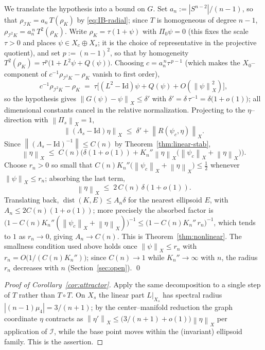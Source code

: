 \documentclass[10pt,a4paper]{amsart}
\newcommand{\IB}{\mathcal{I}}
\newcommand{\norm}[1]{\left\lVert #1 \right\rVert}
\newcommand{\abs}[1]{\left\lvert #1 \right\rvert}
\DeclareMathOperator{\dist}{dist}
\begin{document}
We translate the hypothesis into a bound on $G$. Set
$a_n:=\abs{S^{n-2}}/(n-1)$, so that $\rho_{\IB K}=a_n\,T(\rho_K)$ by
\eqref{eq:IB-radial}; since $T$ is homogeneous of degree $n-1$,
$\rho_{\IB^2K}=a_n^{\,n}\,T^2(\rho_K)$. Write $\rho_K=\tau(1+\psi)$ with
$\Pi_0\psi=0$ (this fixes the scale $\tau>0$ and places
$\psi\in X_c\oplus X_s$; it is the choice of representative in the projective
quotient), and set $p:=(n-1)^2$, so that by homogeneity
$T^2(\rho_K)=\tau^{p}\big(1+L^2\psi+Q(\psi)\big)$. Choosing
$c=a_n^{\,n}\tau^{\,p-1}$ (which makes the $X_0$--component of
$c^{-1}\rho_{\IB^2K}-\rho_K$ vanish to first order),
\[
   c^{-1}\rho_{\IB^2 K}-\rho_K
   \;=\;\tau\Big[(L^2-\mathrm{Id})\psi+Q(\psi)+O(\norm\psi^2_X)\Big],
\]
so the hypothesis gives $\norm{G(\psi)-\psi}_X\le\delta'$ with
$\delta'=\delta\,\tau^{-1}=\delta\big(1+o(1)\big)$; all dimensional constants
cancel in the relative normalization. Projecting to the $\eta$--direction
with $\norm{\Pi_s}_X=1$,
\[
   \norm{(\Lambda_s-\mathrm{Id})\eta}_X
   \;\le\;\delta'+\norm{R(\psi_c,\eta)}_X .
\]
Since $\norm{(\Lambda_s-\mathrm{Id})^{-1}}\le C(n)$ by
Theorem~\ref{thm:linear-stab},
\[
   \norm\eta_X\;\le\;C(n)\Big(\delta(1+o(1))
   +K_n''\norm\eta_X\big(\norm{\psi_c}_X+\norm\eta_X\big)\Big).
\]
Choose $r_n>0$ so small that $C(n)K_n''\big(\norm{\psi_c}_X+\norm\eta_X\big)
\le\tfrac12$ whenever $\norm\psi_X\le r_n$; absorbing the last term,
\[
   \norm\eta_X\;\le\;2\,C(n)\,\delta(1+o(1)).
\]
Translating back, $\dist(K,E)\le A_n\delta$ for the nearest ellipsoid $E$,
with $A_n\le 2C(n)(1+o(1))$; more precisely the absorbed factor is
$\big(1-C(n)K_n''(\norm{\psi_c}_X+\norm\eta_X)\big)^{-1}\le
\big(1-C(n)K_n''\,r_n\big)^{-1}$, which tends to $1$ as $r_n\to0$, giving
$A_n\to C(n)$. This is Theorem~\ref{thm:nonlinear}. The smallness
condition used above holds once $\norm\psi_X\le r_n$ with
$r_n=O\big(1/(C(n)K_n'')\big)$; since $C(n)\to1$ while
$K_n''\to\infty$ with $n$, the radius $r_n$ decreases with $n$
(Section~\ref{sec:open}).
\qed

\begin{proof}[Proof of Corollary~\ref{cor:attractor}]
Apply the same decomposition to a single step of $T$ rather than $T\circ T$.
On $X_s$ the linear part $L|_{X_s}$ has spectral radius $\abs{(n-1)\mu_4}
=3/(n+1)$; by the center--manifold reduction the graph coordinate $\eta$
contracts as $\norm{\eta'}_X\le\big(3/(n+1)+o(1)\big)\norm\eta_X$ per
application of $\IB$, while the base point moves within the (invariant)
ellipsoid family. This is the assertion.
\end{proof}
\end{document}
